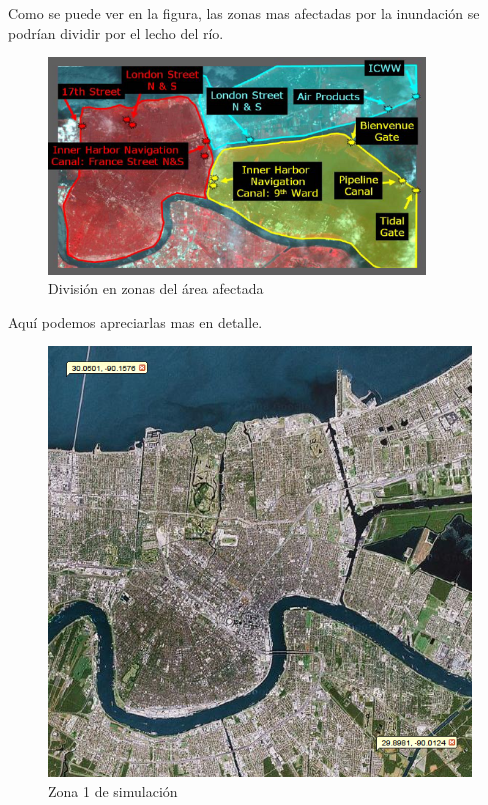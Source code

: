 Como se puede ver en la figura, las zonas mas afectadas por la inundación se
podrían dividir por el lecho del río.

\begin{figure}[H]
 \centering
 \includegraphics[width=100mm]{figuras/cap6/affected.png}
 \caption{División en zonas del área afectada}
\end{figure}

Aquí podemos apreciarlas mas en detalle.

\begin{figure}[H]
 \centering
 \includegraphics[width=120mm]{figuras/cap6/NOarea2.png}
 \caption{Zona 1 de simulación}
\end{figure}

